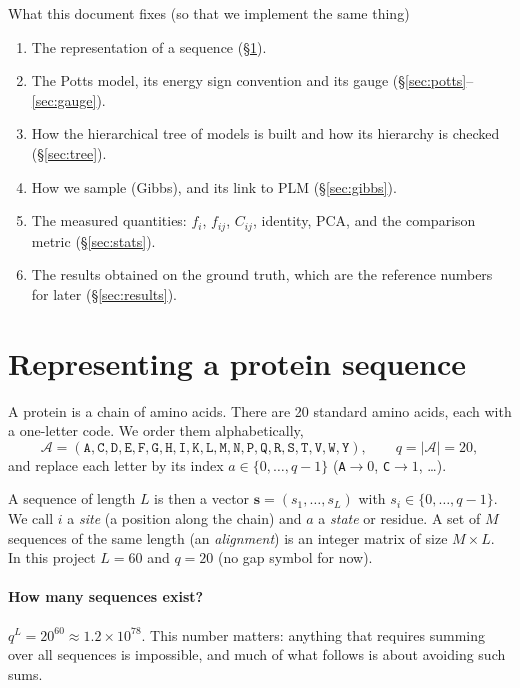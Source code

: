 \documentclass[11pt,a4paper]{article}
\newcommand{\s}{\bm{s}}
\begin{document}
\begin{keybox}{What this document fixes (so that we implement the same thing)}
\begin{enumerate}[nosep]
  \item The representation of a sequence (\S\ref{sec:repr}).
  \item The Potts model, its energy sign convention and its gauge (\S\ref{sec:potts}--\ref{sec:gauge}).
  \item How the hierarchical tree of models is built and how its hierarchy is checked (\S\ref{sec:tree}).
  \item How we sample (Gibbs), and its link to PLM (\S\ref{sec:gibbs}).
  \item The measured quantities: $f_i$, $f_{ij}$, $C_{ij}$, identity, PCA, and the comparison metric (\S\ref{sec:stats}).
  \item The results obtained on the ground truth, which are the reference numbers for later (\S\ref{sec:results}).
\end{enumerate}
\end{keybox}

\section{Representing a protein sequence}\label{sec:repr}
A protein is a chain of amino acids. There are 20 standard amino acids, each with a one-letter code.
We order them alphabetically,
\[
\mathcal{A} = (\texttt{A},\texttt{C},\texttt{D},\texttt{E},\texttt{F},\texttt{G},\texttt{H},\texttt{I},\texttt{K},\texttt{L},
\texttt{M},\texttt{N},\texttt{P},\texttt{Q},\texttt{R},\texttt{S},\texttt{T},\texttt{V},\texttt{W},\texttt{Y}),
\qquad q = |\mathcal{A}| = 20 ,
\]
and replace each letter by its index $a\in\{0,\dots,q-1\}$ (\texttt{A}$\to0$, \texttt{C}$\to1$, \dots).

A sequence of length $L$ is then a vector $\s=(s_1,\dots,s_L)$ with $s_i\in\{0,\dots,q-1\}$.
We call $i$ a \emph{site} (a position along the chain) and $a$ a \emph{state} or residue.
A set of $M$ sequences of the same length (an \emph{alignment}) is an integer matrix of size $M\times L$.
In this project $L=60$ and $q=20$ (no gap symbol for now).

\paragraph{How many sequences exist?} $q^L = 20^{60}\approx 1.2\times10^{78}$. This number matters:
anything that requires summing over all sequences is impossible, and much of what follows is about
avoiding such sums.
\end{document}
